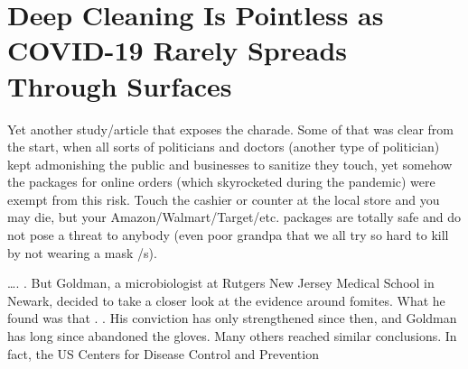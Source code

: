 \chapter{Deep Cleaning Is Pointless as COVID-19 Rarely Spreads Through Surfaces}

\begin{refsection}

Yet another study/article that exposes the charade. Some of that was clear from the start, when all sorts of politicians and doctors (another type of politician) kept admonishing the public and businesses to sanitize  they touch, yet somehow the packages for online orders (which skyrocketed during the pandemic) were exempt from this risk. Touch the cashier or counter at the local store and you may die, but your Amazon/Walmart/Target/etc. packages are totally safe and do not pose a threat to anybody (even poor grandpa that we all try so hard to kill by not wearing a mask /s).


\begin{tcolorbox}[quote]

\dots{}. . But Goldman, a microbiologist at Rutgers New Jersey Medical School in Newark, decided to take a closer look at the evidence around fomites. What he found was that . . His conviction has only strengthened since then, and Goldman has long since abandoned the gloves. Many others reached similar conclusions. In fact, the US Centers for Disease Control and Prevention \textsuperscript{\cite{url8213hhds}}

\end{tcolorbox}

\printbibliography[heading=subbibliography]

\end{refsection}